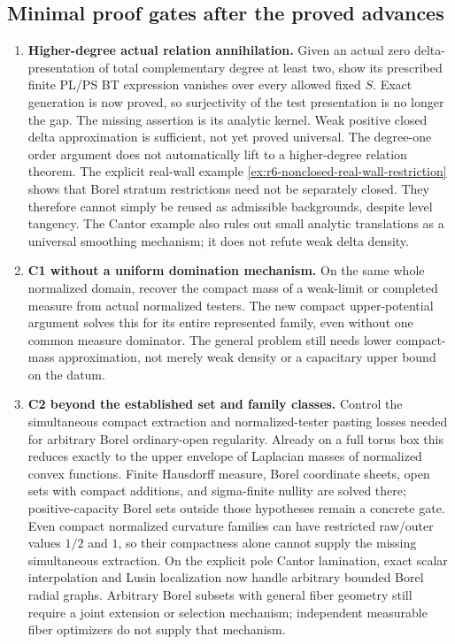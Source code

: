 \documentclass[11pt,a4paper]{article}
\numberwithin{equation}{section}
\theoremstyle{definition}
\theoremstyle{remark}
\begin{document}
\subsection{Minimal proof gates after the proved advances}

\begin{enumerate}
\item \textbf{Higher-degree actual relation annihilation.}
Given an actual zero delta-presentation of total complementary
degree at least two, show its prescribed finite PL/PS BT expression
vanishes over every allowed fixed $S$. Exact generation is now
proved, so surjectivity of the test presentation is no longer the
gap. The missing assertion is its analytic kernel. Weak positive
closed delta approximation is sufficient, not yet proved universal.
The degree-one order argument does not automatically lift to a
higher-degree relation theorem. The explicit real-wall example
\ref{ex:r6-nonclosed-real-wall-restriction} shows that Borel stratum
restrictions need not be separately closed. They therefore cannot
simply be reused as admissible backgrounds, despite level tangency.
The Cantor example also rules out small analytic translations as a
universal smoothing mechanism; it does not refute weak delta density.

\item \textbf{C1 without a uniform domination mechanism.}
On the same whole normalized domain, recover the compact mass of
a weak-limit or completed measure from actual normalized testers.
The new compact upper-potential argument solves this for its entire
represented family, even without one common measure dominator.
The general problem still needs lower compact-mass approximation,
not merely weak density or a capacitary upper bound on the datum.

\item \textbf{C2 beyond the established set and family classes.}
Control the simultaneous compact extraction and normalized-tester
pasting losses needed for arbitrary Borel ordinary-open regularity.
Already on a full torus box this reduces exactly to the upper envelope
of Laplacian masses of normalized convex functions. Finite Hausdorff
measure, Borel coordinate sheets, open sets with compact additions,
and sigma-finite nullity are solved
there; positive-capacity Borel sets outside those hypotheses remain a
concrete gate. Even compact normalized curvature families can have
restricted raw/outer values $1/2$ and $1$, so their compactness alone
cannot supply the missing simultaneous extraction.
On the explicit pole Cantor lamination, exact scalar interpolation
and Lusin localization now handle arbitrary bounded Borel radial
graphs. Arbitrary Borel subsets with general fiber geometry still
require a joint extension or selection mechanism; independent
measurable fiber optimizers do not supply that mechanism.


\end{enumerate}
\end{document}
